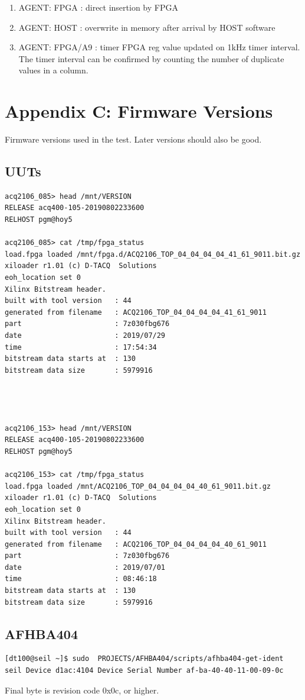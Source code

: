 \documentclass{article}
\begin{document}
\begin{enumerate}
	\item AGENT: FPGA    : direct insertion by FPGA
	\item AGENT: HOST    : overwrite in memory after arrival by HOST software
	\item AGENT: FPGA/A9 : timer FPGA reg value updated on 1kHz timer interval. The timer interval can be confirmed by counting the number of duplicate values in a column.
\end{enumerate}

\section{Appendix C: Firmware Versions}

Firmware versions used in the test. Later versions should also be good.

\subsection{UUTs}
\begin{verbatim}
acq2106_085> head /mnt/VERSION 
RELEASE acq400-105-20190802233600
RELHOST pgm@hoy5

acq2106_085> cat /tmp/fpga_status 
load.fpga loaded /mnt/fpga.d/ACQ2106_TOP_04_04_04_04_41_61_9011.bit.gz
xiloader r1.01 (c) D‑TACQ  Solutions
eoh_location set 0
Xilinx Bitstream header.
built with tool version   : 44
generated from filename   : ACQ2106_TOP_04_04_04_04_41_61_9011
part                      : 7z030fbg676
date                      : 2019/07/29
time                      : 17:54:34
bitstream data starts at  : 130
bitstream data size       : 5979916




acq2106_153> head /mnt/VERSION 
RELEASE acq400-105-20190802233600
RELHOST pgm@hoy5

acq2106_153> cat /tmp/fpga_status 
load.fpga loaded /mnt/ACQ2106_TOP_04_04_04_04_40_61_9011.bit.gz
xiloader r1.01 (c) D‑TACQ  Solutions
eoh_location set 0
Xilinx Bitstream header.
built with tool version   : 44
generated from filename   : ACQ2106_TOP_04_04_04_04_40_61_9011
part                      : 7z030fbg676
date                      : 2019/07/01
time                      : 08:46:18
bitstream data starts at  : 130
bitstream data size       : 5979916
\end{verbatim}
\subsection{AFHBA404}
\begin{verbatim}
[dt100@seil ~]$ sudo  PROJECTS/AFHBA404/scripts/afhba404-get-ident 
seil Device d1ac:4104 Device Serial Number af-ba-40-40-11-00-09-0c
\end{verbatim}
Final byte is revision code 0x0c, or higher.
\end{document}
